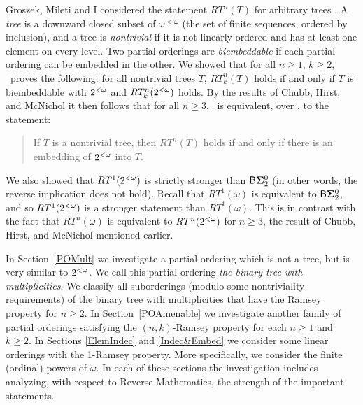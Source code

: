 Groszek, Mileti and I considered the statement $RT^n(T)$
for arbitrary trees \cite{CGM}.
A \textit{tree} is a downward closed subset of $\omega^{<\omega}$
(the set of finite sequences, ordered by inclusion), and
a tree is \textit{nontrivial} if it is not linearly ordered and
has at least one element on every level.
Two partial orderings are \textit{biembeddable} if each
partial ordering can be embedded in the other.
We showed that for all $n\geq 1$, $k\geq 2$, \RCAo\ proves the following:
for all nontrivial trees $T$, $RT^n_k(T)$ holds if and only if $T$ is
biembeddable with $2^{<\omega}$ and $RT^n_k(2^{<\omega})$ holds.
By the results of Chubb, Hirst, and McNichol it then
follows that for all $n\geq 3$, \ACAo\ is equivalent, over \RCAo, to the
statement:
\begin{quote}
If $T$ is a nontrivial tree, then $RT^n(T)$
holds if and only if there is an embedding of $2^{<\omega}$ into $T$.
\end{quote}
We also showed that $RT^1(2^{<\omega})$ is strictly stronger than $\mathsf{B}{\mathbf{\Sigma}^0_2}$
(in other words, the reverse implication does not hold).
Recall that $RT^1(\omega)$ is equivalent to $\mathsf{B}{\mathbf{\Sigma}^0_2}$,
and so $RT^1(2^{<\omega})$ is a stronger statement than $RT^1(\omega)$.
This is in contrast with the fact that $RT^n(\omega)$
is equivalent to $RT^n(2^{<\omega})$ for $n\geq 3$, the result of Chubb, Hirst, and McNichol
mentioned earlier.

In Section~\ref{POMult} we investigate a partial ordering which
is not a tree, but is very similar to $2^{<\omega}$.
We call this partial ordering \textit{the binary tree with multiplicities}.
We classify all suborderings (modulo some nontriviality requirements)
of the binary tree with multiplicities that have the Ramsey property for $n\geq 2$.
In Section~\ref{POAmenable} we investigate another family of partial
orderings satisfying the $(n,k)$-Ramsey property for each $n\geq 1$ and $k\geq 2$.
In Sections \ref{ElemIndec} and \ref{Indec&Embed} we consider some linear orderings
with the 1-Ramsey property.
More specifically, we consider the finite (ordinal) powers of $\omega$.
In each of these sections the investigation includes
analyzing, with respect to Reverse Mathematics, the strength of the
important statements.
